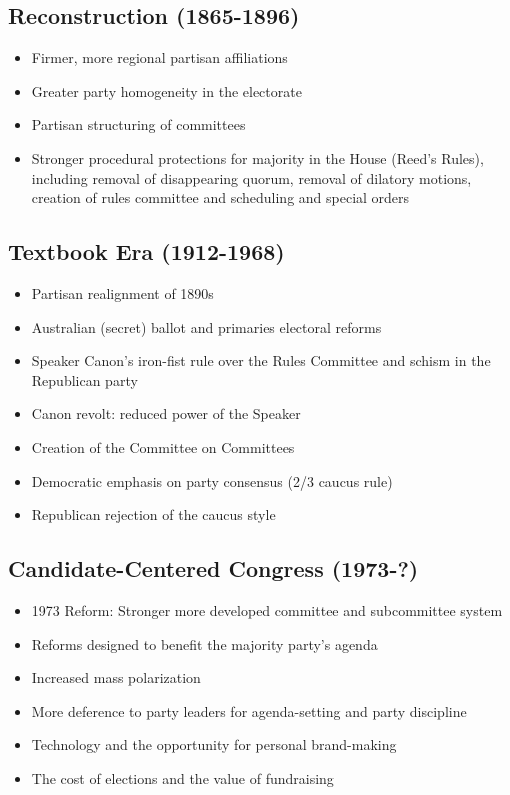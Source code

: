 \documentclass[10pt]{article}
\begin{document}
\subsection{Reconstruction (1865-1896)}
\begin{itemize}
    \item Firmer, more regional partisan affiliations
    \item Greater party homogeneity in the electorate
    \item Partisan structuring of committees
    \item Stronger procedural protections for majority in the House (Reed's Rules), including removal of disappearing quorum, removal of dilatory motions, creation of rules committee and scheduling and special orders
\end{itemize}



\subsection{Textbook Era (1912-1968)}
\begin{itemize}
    \item Partisan realignment of 1890s
    \item Australian (secret) ballot and primaries electoral reforms
    \item Speaker Canon's iron-fist rule over the Rules Committee and schism in the Republican party
    \item Canon revolt: reduced power of the Speaker
    \item Creation of the Committee on Committees
    \item Democratic emphasis on party consensus (2/3 caucus rule)
    \item Republican rejection of the caucus style
\end{itemize}



\subsection{Candidate-Centered Congress (1973-?)}
\begin{itemize}
    \item 1973 Reform: Stronger more developed committee and subcommittee system
    \item Reforms designed to benefit the majority party's agenda
    \item Increased mass polarization
    \item More deference to party leaders for agenda-setting and party discipline
    \item Technology and the opportunity for personal brand-making 
    \item The cost of elections and the value of fundraising
\end{itemize}
\end{document}
